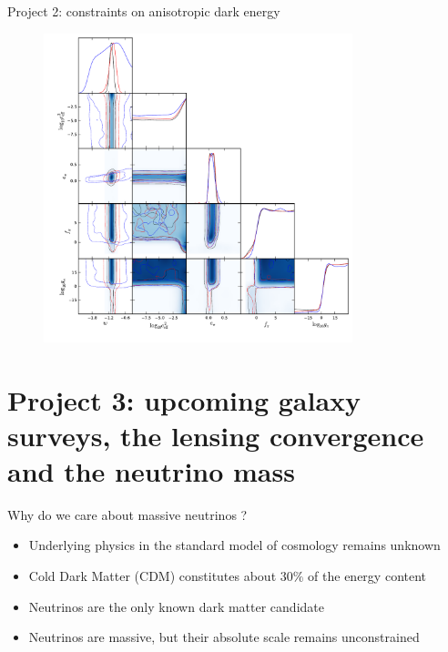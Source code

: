 \documentclass{beamer}
\begin{document}
\begin{frame}{Project 2: constraints on anisotropic dark energy}
\begin{figure}[hbtp]
\centering
\includegraphics[width=0.8\textwidth]{../figures/chapter-ade/PWHiBSwefc_tri.pdf}
\end{figure}

\end{frame}


\section*{Project 3: upcoming galaxy surveys, the lensing convergence and the neutrino mass}

\begin{frame}{Why do we care about massive neutrinos ?}
\begin{itemize}
\item Underlying physics in the standard model of cosmology remains unknown
\item Cold Dark Matter (CDM) constitutes  about $30\%$ of the energy content
\item Neutrinos are the only known dark matter candidate
\item Neutrinos are massive, but their absolute scale remains unconstrained
\end{itemize}
\end{frame}
\end{document}
